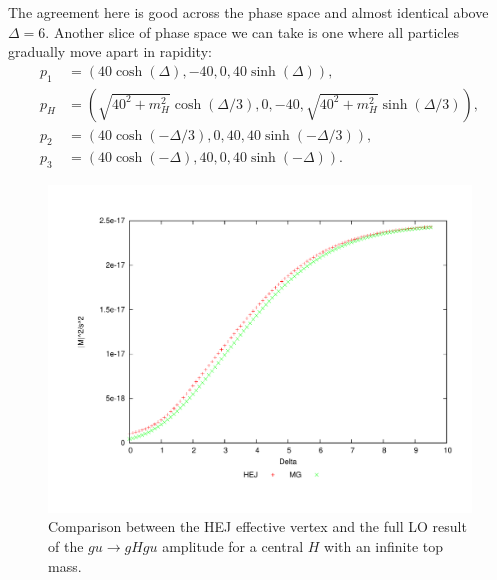 The agreement here is good across the phase space and almost identical above $\Delta = 6$. Another slice of phase space we can take is one where all particles gradually move apart in rapidity:
\begin{subequations}
\begin{align}
p_1 &= (40 \cosh(\Delta),-40,0,40 \sinh(\Delta)), \\
p_H &= (\sqrt{40^2+m_H^2} \cosh(\Delta/3), 0,-40,\sqrt{40^2+m_H^2}  \sinh(\Delta/3)), \\
p_2 &= (40 \cosh(-\Delta/3),0,40,40 \sinh(-\Delta/3)), \\
p_3 &= (40 \cosh(-\Delta),40,0,40 \sinh(-\Delta)).
\end{align}
\end{subequations}
\begin{figure}[t]
\centering
\includegraphics[scale=0.5]{Images/ug_cen.pdf}
\caption{Comparison between the HEJ effective vertex and the full LO result of the $gu \to gHgu$ amplitude for a central $H$ with an infinite top mass.}
\label{fig:ug_cen}
\end{figure}

